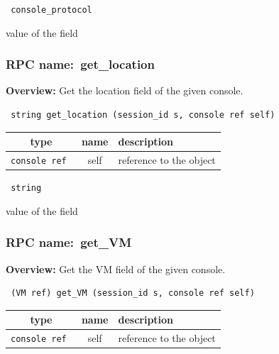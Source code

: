 \vspace{0.3cm}

{\tt 
console\_protocol
}


value of the field
\vspace{0.3cm}
\vspace{0.3cm}
\vspace{0.3cm}
\subsubsection{RPC name:~get\_location}

{\bf Overview:} 
Get the location field of the given console.

\begin{verbatim} string get_location (session_id s, console ref self)\end{verbatim}



 
\vspace{0.3cm}
\begin{tabular}{|c|c|p{7cm}|}
 \hline
{\bf type} & {\bf name} & {\bf description} \\ \hline
{\tt console ref } & self & reference to the object \\ \hline 

\end{tabular}

\vspace{0.3cm}

{\tt 
string
}


value of the field
\vspace{0.3cm}
\vspace{0.3cm}
\vspace{0.3cm}
\subsubsection{RPC name:~get\_VM}

{\bf Overview:} 
Get the VM field of the given console.

\begin{verbatim} (VM ref) get_VM (session_id s, console ref self)\end{verbatim}



 
\vspace{0.3cm}
\begin{tabular}{|c|c|p{7cm}|}
 \hline
{\bf type} & {\bf name} & {\bf description} \\ \hline
{\tt console ref } & self & reference to the object \\ \hline 

\end{tabular}

